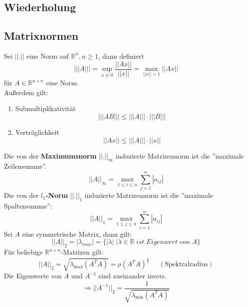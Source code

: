 \documentclass[4pt,a4paper]{scrartcl}
\begin{document}
\setlength{\columnseprule}{0.1pt}
\setlength{\columnsep}{6pt}
\begin{multicols}{4}

\section{Wiederholung}

\subsection{Matrixnormen}
Sei $||.||$ eine Norm auf $\mathbb{R}^n,n\geq 1$, dann definiert
\begin{equation*}
|||A|||=\sup\limits_{x\neq 0}\frac{||Ax||}{||x||}=\max\limits_{||x||=1}||Ax||
\end{equation*}
für $A\in\mathbb{R}^{n\times n}$ eine Norm.\\
Außerdem gilt:
\begin{enumerate}
\item Submultiplikativität
\begin{equation*}
|||AB|||\leq |||A|||\cdot |||B|||
\end{equation*}
\item Verträglichkeit
\begin{equation*}
||Ax||\leq |||A|||\cdot ||x||
\end{equation*}
\end{enumerate}
Die von der \textbf{Maximumsnorm} $||.||_{\infty}$ induzierte Matrizennorm ist die ''maximale Zeilensumme''.
\begin{equation*}
||A||_{\infty}=\max\limits_{1\leq i\leq n}\sum\limits_{j=1}^{n}|a_{ij}|
\end{equation*}
Die von der \textbf{$l_1$-Norm} $||.||_1$ induzierte Matrizennorm ist die ''maximale Spaltensumme'':
\begin{equation*}
||A||_1=\max\limits_{1\leq j\leq n}\sum\limits_{i=1}^{n}|a_{ij}|
\end{equation*}
Sei $A$ eine symmetrische Matrix, dann gilt:
\begin{equation*}
||A||_2 =|\lambda_{max}|=\{|\lambda|\;|\lambda\in\mathbb{R}\;ist\;Eigenwert\;von\;A\}
\end{equation*}
Für beliebige $\mathbb{R}^{n\times n}$-Matrizen gilt:
\begin{equation*}
||A||_2=\sqrt{\lambda_{\text{max}}(A^TA)}=\rho (A^TA)^{\frac{1}{2}}\;\;\;\;\;(\text{Spektralradius})
\end{equation*}
Die Eigenwerte von $A$ und $A^{-1}$ sind zueinander invers.
\begin{equation*}
\Rightarrow||A^{-1}||_2=\frac{1}{\sqrt{\lambda_{\text{min}}(A^TA)}}
\end{equation*}


\end{multicols}
\end{document}
